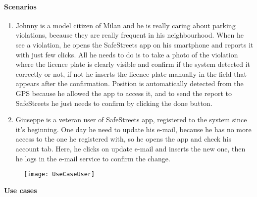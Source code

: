 \paragraph{Scenarios}
    \begin{enumerate}
        \item Johnny is a model citizen of Milan and he is really caring about parking violations, because they are really frequent in his neighbourhood. When he see a violation, he opens the SafeStreets app on his smartphone and reports it with just few clicks. All he needs to do is to take a photo of the violation where the licence plate is clearly visible and confirm if the system detected it correctly or not, if not he inserts the licence plate manually in the field that appears after the confirmation. Position is automatically detected from the GPS because he allowed the app to access it, and to send the report to SafeStreets he just needs to confirm by clicking the done button.
        
        \item Giuseppe is a veteran user of SafeStreets app, registered to the system since it's beginning. One day he need to update his e-mail, because he has no more access to the one he registered with, so he opens the app and check his account tab. Here, he clicks on update e-mail and inserts the new one, then he logs in the e-mail service to confirm the change.
    \end{enumerate}

\begin{figure}[H]
	\centering
    \texttt{[image: UseCaseUser]}
\end{figure}	
\textbf{Use cases}\\
\vskip 0.2in

